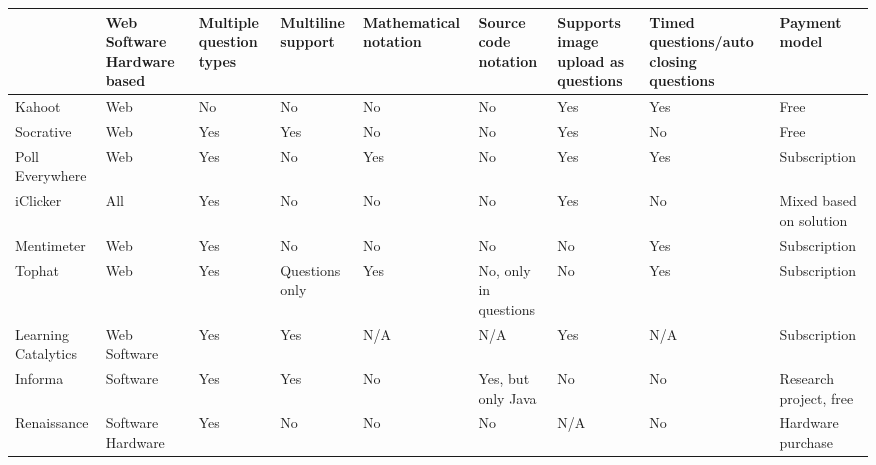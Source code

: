 \begin{landscape}
\thispagestyle{empty}
    \begin{center}
        \begin{table}[H]
            \begin{tabularx}{\paperwidth}{ |X|X|X|X|X|X|X|X|X| } 
             \hline
                 & Web \newline Software \newline Hardware based & Multiple question types & Multiline support & Mathematical notation & Source code notation & Supports image upload as questions & Timed questions/auto closing questions & Payment model \\ \hline
                 
              Kahoot                & Web   & No    & No    & \cellcolor{red!25}No    & \cellcolor{red!25}No    & Yes   & Yes   & Free \\ \hline
              Socrative             & Web   & Yes   & Yes   & \cellcolor{red!25}No    & \cellcolor{red!25}No    & Yes   & No    & Free \\ \hline
              Poll Everywhere       & Web   & Yes   & No    & \cellcolor{green!25}Yes   & \cellcolor{red!25}No    & Yes   & Yes   & Subscription \\ \hline
              iClicker              & All   & Yes   & No    & \cellcolor{red!25}No    & \cellcolor{red!25}No    & Yes   & No    & Mixed based on solution \\ \hline
              Mentimeter            & Web   & Yes & No   & \cellcolor{red!25}No    & \cellcolor{red!25}No    & No    & Yes   & Subscription \\ \hline
              Tophat                & Web   & Yes & Questions only & \cellcolor{green!25}Yes & \cellcolor{red!25}No, only in questions   & No    & Yes & Subscription \\ \hline
              Learning Catalytics   & Web \newline Software   & Yes    & Yes  & N/A   & N/A   & Yes   & N/A   & Subscription \\ \hline
              Informa        & Software & Yes & Yes  & \cellcolor{red!25}No & \cellcolor{green!25}Yes, but only Java   & No    & No    & Research project, free \\ \hline
              Renaissance           & Software \newline Hardware & Yes & No & \cellcolor{red!25} No & \cellcolor{red!25}No & N/A & No & Hardware purchase \\ \hline

\end{tabularx}
\end{table}
\end{center}
\end{landscape}
